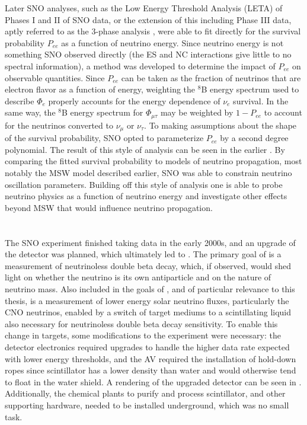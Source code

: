 Later SNO analyses, such as the Low Energy Threshold Analysis (LETA) \cite{leta} of Phases I and II of SNO data, or the extension of this including Phase III data, aptly referred to as the 3-phase analysis \cite{3phase}, were able to fit directly for the survival probability $P_{ee}$ as a function of neutrino energy.
Since neutrino energy is not something SNO observed directly (the ES and NC interactions give little to no spectral information), a method was developed to determine the impact of $P_{ee}$ on observable quantities.
Since $P_{ee}$ can be taken as the fraction of neutrinos that are electron flavor as a function of energy, weighting the $^8$B energy spectrum used to describe $\Phi_e$ properly accounts for the energy dependence of $\nu_e$ survival.
In the same way, the $^8$B energy spectrum for $\Phi_{\mu\tau}$ may be weighted by $1-P_{ee}$ to account for the neutrinos converted to $\nu_\mu$ or $\nu_\tau$.
To making assumptions about the shape of the survival probability, SNO opted to parameterize $P_{ee}$ by a second degree polynomial.
The result of this style of analysis can be seen in the earlier .
By comparing the fitted survival probability to models of neutrino propagation, most notably the MSW model described earlier, SNO was able to constrain neutrino oscillation parameters.
Building off this style of analysis one is able to probe neutrino physics as a function of neutrino energy and investigate other effects beyond MSW that would influence neutrino propagation.

\section{{\snop}}

The SNO experiment finished taking data in the early 2000s, and an upgrade of the detector was planned, which ultimately led to {\snop} \cite{snop}.
The primary goal of {\snop} is a measurement of neutrinoless double beta decay, which, if observed, would shed light on whether the neutrino is its own antiparticle and on the nature of neutrino mass.
Also included in the goals of {\snop}, and of particular relevance to this thesis, is a measurement of lower energy solar neutrino fluxes, particularly the CNO neutrinos, enabled by a switch of target mediums to a scintillating liquid also necessary for neutrinoless double beta decay sensitivity.
To enable this change in targets, some modifications to the experiment were necessary: the detector electronics required upgrades to handle the higher data rate expected with lower energy thresholds, and the AV required the installation of hold-down ropes since scintillator has a lower density than water and would otherwise tend to float in the water shield.
A rendering of the upgraded detector can be seen in .
Additionally, the chemical plants to purify and process scintillator, and other supporting hardware, needed to be installed underground, which was no small task.

